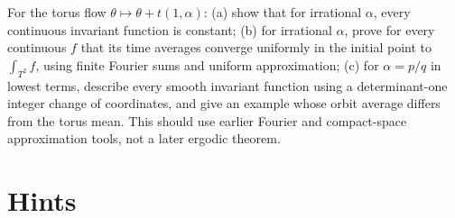 \begin{exercise}[$\star\star\star$]\label{ex:v9-ch02-torus-averages}
For the torus flow $\theta\mapsto\theta+t(1,\alpha)$:
(a) show that for irrational $\alpha$, every continuous invariant function is constant;
(b) for irrational $\alpha$, prove for every continuous $f$ that its time averages converge uniformly in the initial point to $\int_{T^2}f$, using finite Fourier sums and uniform approximation;
(c) for $\alpha=p/q$ in lowest terms, describe every smooth invariant function using a determinant-one integer change of coordinates, and give an example whose orbit average differs from the torus mean. This should use earlier Fourier and compact-space approximation tools, not a later ergodic theorem.
\end{exercise}

\section{Hints}

